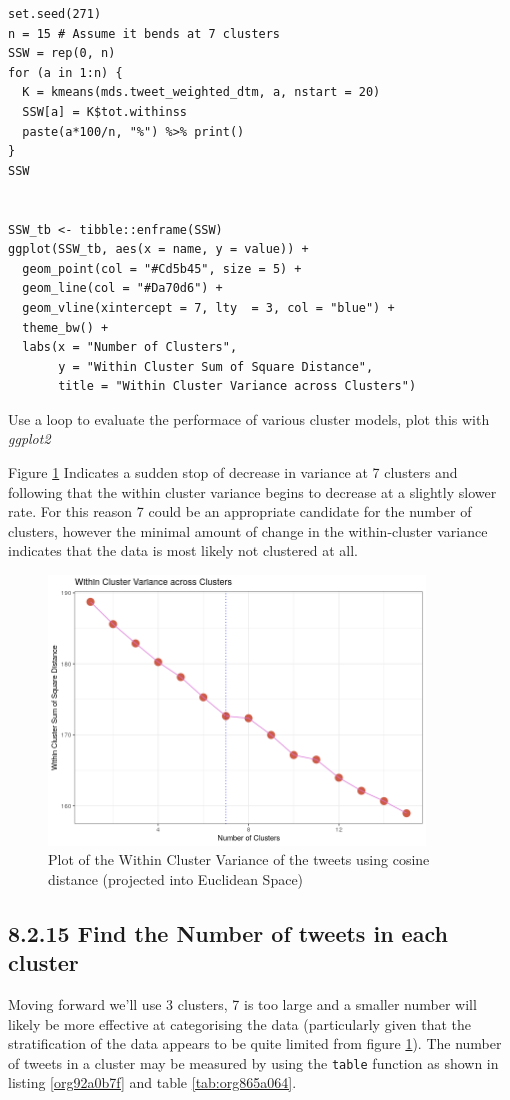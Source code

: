 \documentclass[11pt]{article}
\begin{document}
\begin{listing}[htbp]
\begin{verbatim}
set.seed(271)
n = 15 # Assume it bends at 7 clusters
SSW = rep(0, n)
for (a in 1:n) {
  K = kmeans(mds.tweet_weighted_dtm, a, nstart = 20)
  SSW[a] = K$tot.withinss
  paste(a*100/n, "%") %>% print()
}
SSW


SSW_tb <- tibble::enframe(SSW)
ggplot(SSW_tb, aes(x = name, y = value)) +
  geom_point(col = "#Cd5b45", size = 5) +
  geom_line(col = "#Da70d6") +
  geom_vline(xintercept = 7, lty  = 3, col = "blue") +
  theme_bw() +
  labs(x = "Number of Clusters",
       y = "Within Cluster Sum of Square Distance",
       title = "Within Cluster Variance across Clusters")
\end{verbatim}
\caption{\label{org403cd9e}Use a loop to evaluate the performace of various cluster models, plot this with \emph{ggplot2}}
\end{listing}

Figure \ref{fig:orgfd3aa3f} Indicates a sudden stop of decrease in variance at 7 clusters and following that the within cluster variance begins to decrease at a slightly slower rate. For this reason 7 could be an appropriate candidate for the number of clusters, however the minimal amount of change in the within-cluster variance indicates that the data is most likely not clustered at all.


\begin{figure}[htbp]
\centering
\includegraphics[width=10cm]{./Figures/Q14WithinClusterVariance.png}
\caption{\label{fig:orgfd3aa3f}Plot of the Within Cluster Variance of the tweets using cosine distance (projected into Euclidean Space)}
\end{figure}

\subsection{8.2.15 Find the Number of tweets in each cluster}
\label{sec:org443ef3f}
Moving forward we'll use 3 clusters, 7 is too large and a smaller number will likely be more effective at categorising the data (particularly given that the stratification of the data appears to be quite limited from figure \ref{fig:orgfd3aa3f}). The number of tweets in a cluster may be measured by using the \texttt{table} function as shown in listing \ref{org92a0b7f} and table \ref{tab:org865a064}.
\end{document}
